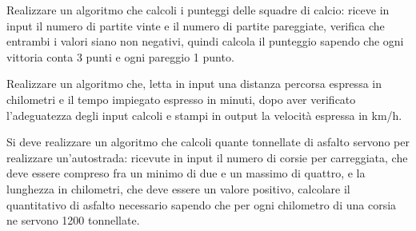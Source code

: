 \begin{exercise}
	Realizzare un algoritmo che calcoli i punteggi delle squadre di calcio: riceve in input il numero di partite vinte e il numero di partite pareggiate, verifica che entrambi i valori siano non negativi, quindi calcola il punteggio sapendo che ogni vittoria conta 3 punti e ogni pareggio 1 punto.
\end{exercise}

\begin{exercise}
	Realizzare un algoritmo che, letta in input una distanza percorsa espressa in chilometri e il tempo impiegato espresso in minuti, dopo aver verificato l'adeguatezza degli input calcoli e stampi in output la velocità espressa in km/h.
\end{exercise}

\begin{exercise}
	Si deve realizzare un algoritmo che calcoli quante tonnellate di asfalto servono per realizzare un'autostrada: ricevute in input il numero di corsie per carreggiata, che deve essere compreso fra un minimo di due e un massimo di quattro, e la lunghezza in chilometri, che deve essere un valore positivo, calcolare il quantitativo di asfalto necessario sapendo che per ogni chilometro di una corsia ne servono 1200 tonnellate.
\end{exercise}